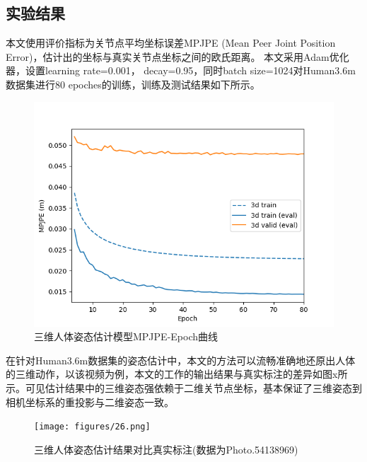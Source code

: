 \subsection{实验结果}{}
本文使用评价指标为关节点平均坐标误差MPJPE (Mean Peer Joint Position Error)，估计出的坐标与真实关节点坐标之间的欧氏距离。
本文采用Adam优化器，设置learning rate=0.001， decay=0.95，同时batch size=1024对Human3.6m数据集进行80 epoches的训练，训练及测试结果如下所示。
\begin{figure}[h]
	\centering
	\includegraphics[scale=0.4]{figures/25.png}
	\caption{三维人体姿态估计模型MPJPE-Epoch曲线}
	\label{fig:f25}
\end{figure}
在针对Human3.6m数据集的姿态估计中，本文的方法可以流畅准确地还原出人体的三维动作，以该视频为例，本文的工作的输出结果与真实标注的差异如图x所示。可见估计结果中的三维姿态强依赖于二维关节点坐标，基本保证了三维姿态到相机坐标系的重投影与二维姿态一致。
\begin{figure}[h]
	\centering
	\texttt{[image: figures/26.png]}
	\caption{三维人体姿态估计结果对比真实标注(数据为Photo.54138969)}
	\label{fig:f26}
\end{figure}
